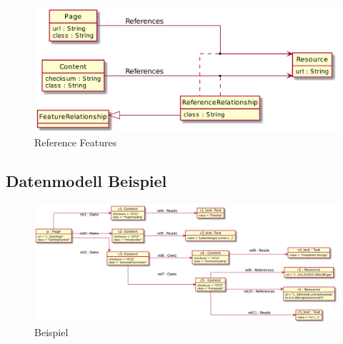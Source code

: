             \begin{figure}
                \centering
                \includegraphics[width=\textwidth]{../resources/db-data-model/resource-relationship.png}
                \caption{Reference Features}
                \label{image:dbDataModelResourceRelationship}
            \end{figure}

        \subsection{Datenmodell Beispiel}
            \begin{figure}
                \centering
                \includegraphics[width=\textwidth]{../resources/db-data-model/example/example.png}
                \caption{Beispiel}
                \label{image:dbDataModelExampleOverview}
            \end{figure}

